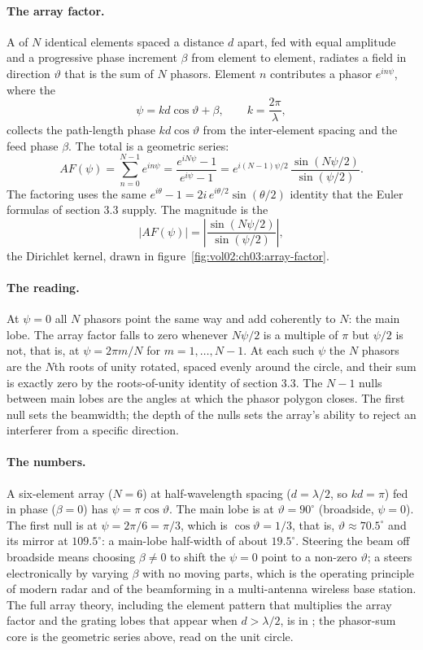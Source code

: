 \paragraph{The array factor.} A  of $N$
identical elements spaced a distance $d$ apart, fed with equal amplitude
and a progressive phase increment $\beta$ from element to element, radiates
a field in direction $\vartheta$ that is the sum of $N$ phasors. Element
$n$ contributes a phasor $e^{i n\psi}$, where the 
\[
\psi = k d \cos\vartheta + \beta, \qquad k = \frac{2\pi}{\lambda},
\]
collects the path-length phase $k d \cos\vartheta$ from the inter-element
spacing and the feed phase $\beta$. The total is a geometric series:
\[
AF(\psi) = \sum_{n = 0}^{N-1} e^{i n\psi}
= \frac{e^{i N\psi} - 1}{e^{i\psi} - 1}
= e^{i(N-1)\psi/2}\,\frac{\sin(N\psi/2)}{\sin(\psi/2)}.
\]
The factoring uses the same $e^{i\theta} - 1 = 2 i\,e^{i\theta/2}
\sin(\theta/2)$ identity that the Euler formulas of section 3.3 supply.
The magnitude is the 
\[
|AF(\psi)| = \left|\frac{\sin(N\psi/2)}{\sin(\psi/2)}\right|,
\]
the Dirichlet kernel, drawn in
figure~\ref{fig:vol02:ch03:array-factor}.

\paragraph{The reading.} At $\psi = 0$ all $N$ phasors point the same way
and add coherently to $N$: the main lobe. The array factor falls to zero
whenever $N\psi/2$ is a multiple of $\pi$ but $\psi/2$ is not, that is, at
$\psi = 2\pi m / N$ for $m = 1, \ldots, N-1$. At each such $\psi$ the $N$
phasors are the $N$th roots of unity rotated, spaced evenly around the
circle, and their sum is exactly zero by the roots-of-unity identity of
section 3.3. The $N - 1$ nulls between main lobes are the angles at which
the phasor polygon closes. The first null sets the beamwidth; the depth
of the nulls sets the array's ability to reject an interferer from a
specific direction.

\paragraph{The numbers.} A six-element array ($N = 6$) at half-wavelength
spacing ($d = \lambda/2$, so $kd = \pi$) fed in phase ($\beta = 0$) has
$\psi = \pi\cos\vartheta$. The main lobe is at $\vartheta = 90^{\circ}$
(broadside, $\psi = 0$). The first null is at $\psi = 2\pi/6 = \pi/3$,
which is $\cos\vartheta = 1/3$, that is, $\vartheta \approx 70.5^{\circ}$
and its mirror at $109.5^{\circ}$: a main-lobe half-width of about
$19.5^{\circ}$. Steering the beam off broadside means choosing $\beta \ne
0$ to shift the $\psi = 0$ point to a non-zero $\vartheta$; a
 steers electronically by varying $\beta$ with no
moving parts, which is the operating principle of modern radar and of the
beamforming in a multi-antenna wireless base station. The full array
theory, including the element pattern that multiplies the array factor
and the grating lobes that appear when $d > \lambda/2$, is in
\cite[chapter 6]{text:balanis-antennas}; the phasor-sum core is the
geometric series above, read on the unit circle.

